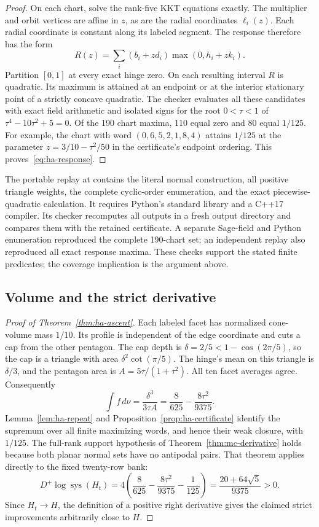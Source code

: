 \begin{proof}
On each chart, solve the rank-five KKT equations exactly. The multiplier
and orbit vertices are affine in $z$, as are the radial coordinates
$\ell_i(z)$. Each radial coordinate is constant along its labeled segment.
The response therefore has the form
\[
 R(z)=\sum_i(b_i+zd_i)\max(0,h_i+zk_i).
\]
Partition $[0,1]$ at every exact hinge zero. On each resulting interval
$R$ is quadratic. Its maximum is attained at an endpoint or at the interior
stationary point of a strictly concave quadratic. The checker evaluates all
these candidates with exact field arithmetic and isolated signs for the
root $0<\tau<1$ of $\tau^4-10\tau^2+5=0$.
Of the 190 chart maxima, 110 equal zero and 80 equal $1/125$.
For example, the chart with word $(0,6,5,2,1,8,4)$ attains $1/125$ at
the parameter $z=3/10-\tau^2/50$ in the certificate's endpoint ordering.
This proves~\eqref{eq:ha-response}.
\end{proof}

The portable replay at 
contains the literal normal construction, all positive
triangle weights, the complete cyclic-order enumeration, and the exact
piecewise-quadratic calculation. It requires Python's standard library and
a C++17 compiler. Its checker recomputes all outputs in a fresh output
directory and compares them with the retained certificate. A separate
Sage-field and Python enumeration reproduced the complete 190-chart set;
an independent replay also reproduced all exact response maxima. These
checks support the stated finite predicates; the coverage implication is
the argument above.

\subsection{Volume and the strict derivative}

\begin{proof}[Proof of Theorem~\ref{thm:ha-ascent}]
Each labeled facet has normalized cone-volume mass $1/10$. Its profile is
independent of the edge coordinate and cuts a cap from the other pentagon.
The cap depth is $\delta=2/5<1-\cos(2\pi/5)$, so the cap is a triangle
with area $\delta^2\cot(\pi/5)$. The hinge's mean on this triangle is
$\delta/3$, and the pentagon area is $A=5\tau/(1+\tau^2)$. All ten facet
averages agree. Consequently
\begin{equation}\label{eq:ha-volume}
 \int f\,d\nu=\frac{\delta^3}{3\tau A}
             =\frac8{625}-\frac{8\tau^2}{9375}.
\end{equation}
Lemma~\ref{lem:ha-repeat} and Proposition~\ref{prop:ha-certificate} identify
the supremum over all finite maximizing words, and hence their weak closure,
with $1/125$. The full-rank support hypothesis of
Theorem~\ref{thm:mc-derivative} holds because both planar normal sets have no
antipodal pairs. That theorem applies directly to the fixed twenty-row bank:
\[
 D^+\log\operatorname{sys}(H_t)
 =4\left(\frac8{625}-\frac{8\tau^2}{9375}-\frac1{125}\right)
 =\frac{20+64\sqrt5}{9375}>0.
\]
Since $H_t\to H$, the definition of a positive right derivative gives the
claimed strict improvements arbitrarily close to $H$.
\end{proof}
